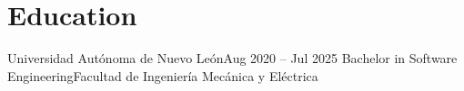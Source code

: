 \section{Education}
    \resumeSubHeadingListStart

    \resumeSubheading
    {Universidad Autónoma de Nuevo León}{Aug 2020 -- Jul 2025}
    {Bachelor in Software Engineering}{Facultad de Ingeniería Mecánica y Eléctrica}

    \resumeSubHeadingListEnd
